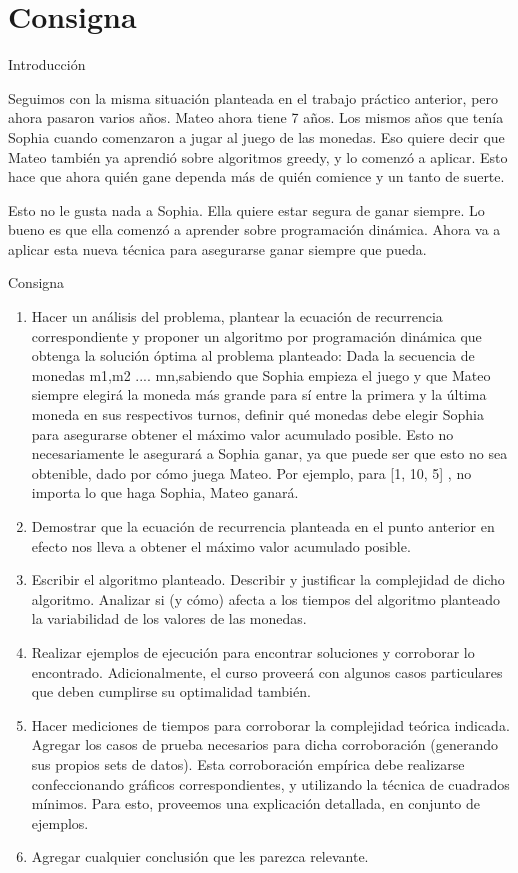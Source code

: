 \section*{Consigna}


{\Large Introducción}
\vskip0.5cm

Seguimos con la misma situación planteada en el trabajo práctico anterior, pero ahora pasaron varios años. Mateo ahora tiene 7 años. Los mismos años que tenía Sophia cuando comenzaron a jugar al juego de las monedas. Eso quiere decir que Mateo también ya aprendió sobre algoritmos greedy, y lo comenzó a aplicar. Esto hace que ahora quién gane dependa más de quién comience y un tanto de suerte.

Esto no le gusta nada a Sophia. Ella quiere estar segura de ganar siempre. Lo bueno es que ella comenzó a aprender sobre programación dinámica. Ahora va a aplicar esta nueva técnica para asegurarse ganar siempre que pueda.

\vskip0.5cm
{\Large Consigna}
\vskip0.5cm

\begin{enumerate}
    \item Hacer un análisis del problema, plantear la ecuación de recurrencia correspondiente y proponer un algoritmo por programación dinámica que obtenga la solución óptima al problema planteado: Dada la secuencia de monedas m1,m2 .... mn,sabiendo que Sophia empieza el juego y que Mateo siempre elegirá la moneda más grande para sí entre la primera y la última moneda en sus respectivos turnos, definir qué monedas debe elegir Sophia para asegurarse obtener el máximo valor acumulado posible. Esto no necesariamente le asegurará a Sophia ganar, ya que puede ser que esto no sea obtenible, dado por cómo juega Mateo. Por ejemplo, para [1, 10, 5] , no importa lo que haga Sophia, Mateo ganará.
    \vskip0.3cm
    \item Demostrar que la ecuación de recurrencia planteada en el punto anterior en efecto nos lleva a obtener el máximo valor acumulado posible.
    \vskip0.3cm
    \item Escribir el algoritmo planteado. Describir y justificar la complejidad de dicho algoritmo. Analizar si (y cómo) afecta a los tiempos del algoritmo planteado la variabilidad de los valores de las monedas.
    \vskip0.3cm
    \item Realizar ejemplos de ejecución para encontrar soluciones y corroborar lo encontrado. Adicionalmente, el curso proveerá con algunos casos particulares que deben cumplirse su optimalidad también.
    \vskip0.3cm
    \item Hacer mediciones de tiempos para corroborar la complejidad teórica indicada. Agregar los casos de prueba necesarios para dicha corroboración (generando sus propios sets de datos). Esta corroboración empírica debe realizarse confeccionando gráficos correspondientes, y utilizando la técnica de cuadrados mínimos. Para esto, proveemos una explicación detallada, en conjunto de ejemplos.
    \vskip0.3cm
    \item Agregar cualquier conclusión que les parezca relevante.
\end{enumerate}


